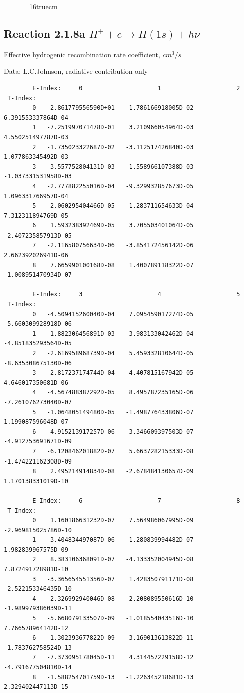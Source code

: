 \documentclass[12pt,dvips]{article}
\begin{document}
\begin{figure} \label{2.1.8FU}
\epsfxsize=16truecm
\end{figure}
\newpage


\subsection{
  Reaction 2.1.8a  $H^+ + e \rightarrow H(1s) + h\nu $
}

   Effective hydrogenic recombination rate coefficient, $cm^3/s$

   Data: L.C.Johnson, radiative contribution only


\begin{small}\begin{verbatim}
        E-Index:     0                     1                     2
 T-Index:
        0   -2.861779556590D+01   -1.786166918005D-02    6.391553337864D-04
        1   -7.251997071478D-01    3.210966054964D-03    4.550251497787D-03
        2   -1.735023322687D-02   -3.112517426840D-03    1.077863345492D-03
        3   -3.557752804131D-03    1.558966107388D-03   -1.037331531958D-03
        4   -2.777882255016D-04   -9.329932857673D-05    1.096331766957D-04
        5    2.060295404466D-05   -1.283711654633D-04    7.312311894769D-05
        6    1.593238392469D-05    3.705503401064D-05   -2.407235857913D-05
        7   -2.116580756634D-06   -3.854172456142D-06    2.662392026941D-06
        8    7.665990100168D-08    1.400789118322D-07   -1.008951470934D-07

        E-Index:     3                     4                     5
 T-Index:
        0   -4.509415260040D-04    7.095459017274D-05   -5.660309928918D-06
        1   -1.882306456891D-03    3.983133042462D-04   -4.851835293564D-05
        2   -2.616958968739D-04    5.459332810644D-05   -8.635308675130D-06
        3    2.817237174744D-04   -4.407815167942D-05    4.646017350681D-06
        4   -4.567488387292D-05    8.495787235165D-06   -7.261076273040D-07
        5   -1.064805149480D-05   -1.498776433806D-07    1.199087596048D-07
        6    4.915213917257D-06   -3.346609397503D-07   -4.912753691671D-09
        7   -6.120846201882D-07    5.663728215333D-08   -1.474221162308D-09
        8    2.495214914834D-08   -2.678484130657D-09    1.170138331019D-10

        E-Index:     6                     7                     8
 T-Index:
        0    1.160186631232D-07    7.564986067995D-09   -2.969815025786D-10
        1    3.404834497087D-06   -1.280839994482D-07    1.982839967575D-09
        2    8.383106368091D-07   -4.133352004945D-08    7.872491728981D-10
        3   -3.365654551356D-07    1.428350791171D-08   -2.522153346435D-10
        4    2.326992940046D-08    2.208089550616D-10   -1.989979386039D-11
        5   -5.668079133507D-09   -1.018554043516D-10    7.766578964142D-12
        6    1.302393677822D-09   -3.169013613822D-11   -1.783762758524D-13
        7   -7.373095178045D-11    4.314457229158D-12   -4.791677504810D-14
        8   -1.588254701759D-13   -1.226345218681D-13    2.329402447113D-15


\end{verbatim}
\end{small}
\end{document}
